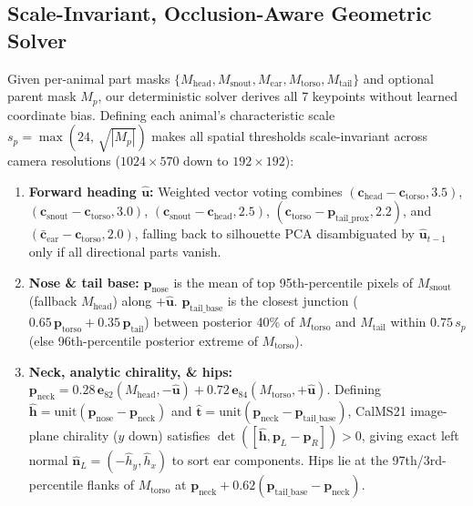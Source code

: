 \documentclass[10pt,twocolumn,letterpaper]{article}
\begin{document}
\subsection{Scale-Invariant, Occlusion-Aware Geometric Solver}
\label{sec:geometry}

Given per-animal part masks $\{M_{\text{head}}, M_{\text{snout}}, M_{\text{ear}}, M_{\text{torso}}, M_{\text{tail}}\}$ and optional parent mask $M_p$, our deterministic solver derives all 7 keypoints without learned coordinate bias. Defining each animal's characteristic scale $s_p = \max(24,\,\sqrt{|M_p|})$ makes all spatial thresholds scale-invariant across camera resolutions ($1024\times 570$ down to $192\times 192$):
\begin{enumerate}[leftmargin=*,itemsep=0.5pt,topsep=1.5pt]
  \item \textbf{Forward heading $\hat{\mathbf{u}}$:} Weighted vector voting combines $(\mathbf{c}_{\text{head}}-\mathbf{c}_{\text{torso}}, 3.5)$, $(\mathbf{c}_{\text{snout}}-\mathbf{c}_{\text{torso}}, 3.0)$, $(\mathbf{c}_{\text{snout}}-\mathbf{c}_{\text{head}}, 2.5)$, $(\mathbf{c}_{\text{torso}}-\mathbf{p}_{\text{tail\_prox}}, 2.2)$, and $(\bar{\mathbf{c}}_{\text{ear}}-\mathbf{c}_{\text{torso}}, 2.0)$, falling back to silhouette PCA disambiguated by $\hat{\mathbf{u}}_{t-1}$ only if all directional parts vanish.
  \item \textbf{Nose \& tail base:} $\mathbf{p}_{\text{nose}}$ is the mean of top 95th-percentile pixels of $M_{\text{snout}}$ (fallback $M_{\text{head}}$) along $+\hat{\mathbf{u}}$. $\mathbf{p}_{\text{tail\_base}}$ is the closest junction ($0.65\,\mathbf{p}_{\text{torso}}+0.35\,\mathbf{p}_{\text{tail}}$) between posterior 40\% of $M_{\text{torso}}$ and $M_{\text{tail}}$ within $0.75\,s_p$ (else 96th-percentile posterior extreme of $M_{\text{torso}}$).
  \item \textbf{Neck, analytic chirality, \& hips:} $\mathbf{p}_{\text{neck}} = 0.28\,\mathbf{e}_{82}(M_{\text{head}}, -\hat{\mathbf{u}}) + 0.72\,\mathbf{e}_{84}(M_{\text{torso}}, +\hat{\mathbf{u}})$. Defining $\hat{\mathbf{h}}=\mathrm{unit}(\mathbf{p}_{\text{nose}}-\mathbf{p}_{\text{neck}})$ and $\hat{\mathbf{t}}=\mathrm{unit}(\mathbf{p}_{\text{neck}}-\mathbf{p}_{\text{tail\_base}})$, CalMS21 image-plane chirality ($y$ down) satisfies $\det([\hat{\mathbf{h}}, \mathbf{p}_L - \mathbf{p}_R]) > 0$, giving exact left normal $\hat{\mathbf{n}}_L = (-\hat{h}_y, \hat{h}_x)$ to sort ear components. Hips lie at the 97th/3rd-percentile flanks of $M_{\text{torso}}$ at $\mathbf{p}_{\text{neck}}+0.62(\mathbf{p}_{\text{tail\_base}}-\mathbf{p}_{\text{neck}})$.
\end{enumerate}
\end{document}
